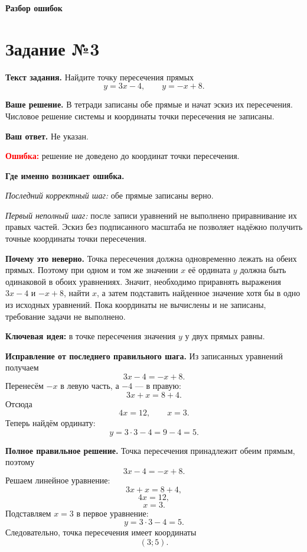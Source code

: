 \documentclass[12pt,a4paper]{article}
\begin{document}
\newpage
\thispagestyle{empty}
\vspace*{\fill}
\begin{center}
{\LARGE\bfseries Разбор ошибок}
\end{center}
\vspace*{\fill}
\newpage

\label{task:3}
\section*{Задание №3}

\textbf{Текст задания.}
Найдите точку пересечения прямых
\[
y=3x-4, \qquad y=-x+8.
\]

\textbf{Ваше решение.}
В тетради записаны обе прямые и начат эскиз их пересечения. Числовое решение системы и координаты точки пересечения не записаны.

\textbf{Ваш ответ.}
Не указан.

\textcolor{red}{\textbf{Ошибка:}} решение не доведено до координат точки пересечения.

\textbf{Где именно возникает ошибка.}

\emph{Последний корректный шаг:} обе прямые записаны верно.

\emph{Первый неполный шаг:} после записи уравнений не выполнено приравнивание их правых частей. Эскиз без подписанного масштаба не позволяет надёжно получить точные координаты точки пересечения.

\textbf{Почему это неверно.}
Точка пересечения должна одновременно лежать на обеих прямых. Поэтому при одном и том же значении $x$ её ордината $y$ должна быть одинаковой в обоих уравнениях. Значит, необходимо приравнять выражения $3x-4$ и $-x+8$, найти $x$, а затем подставить найденное значение хотя бы в одно из исходных уравнений. Пока координаты не вычислены и не записаны, требование задачи не выполнено.

\textcolor{blue!60!black}{\textbf{Ключевая идея:}} в точке пересечения значения $y$ у двух прямых равны.

\textbf{Исправление от последнего правильного шага.}
Из записанных уравнений получаем
\[
3x-4=-x+8.
\]
Перенесём $-x$ в левую часть, а $-4$ --- в правую:
\[
3x+x=8+4.
\]
Отсюда
\[
4x=12,
\qquad
x=3.
\]
Теперь найдём ординату:
\[
y=3\cdot 3-4=9-4=5.
\]

\textbf{Полное правильное решение.}
Точка пересечения принадлежит обеим прямым, поэтому
\[
3x-4=-x+8.
\]
Решаем линейное уравнение:
\[
3x+x=8+4,
\]
\[
4x=12,
\]
\[
x=3.
\]
Подставляем $x=3$ в первое уравнение:
\[
y=3\cdot 3-4=5.
\]
Следовательно, точка пересечения имеет координаты
\[
(3;5).
\]
\end{document}
